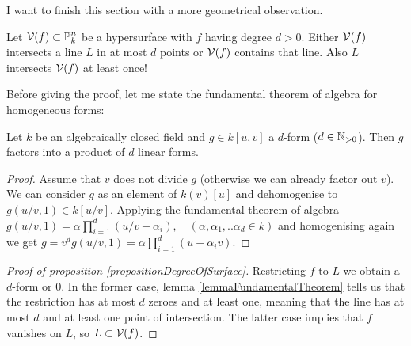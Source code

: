 I want to finish this section with a more geometrical observation.
\begin{proposition} \label{propositionDegreeOfSurface}
Let $\operatorname{\mathcal V}(f) \subset \operatorname{\mathbb P}^n_k$ be a hypersurface with $f$ having degree $d> 0$.
Either $\operatorname{\mathcal V}(f)$ intersects a line $L$ in at most $d$ points or $\operatorname{\mathcal V}(f)$ contains that line.
Also $L$ intersects $\operatorname{\mathcal V}(f)$ at least once!
\end{proposition}

Before giving the proof, let me state the fundamental theorem of algebra for homogeneous forms:

\begin{lemma} \label{lemmaFundamentalTheorem}
Let $k$ be an algebraically closed field and $g \in k[u,v]$ a $d$-form ($d \in \operatorname{\mathbb N_{>0}}$).
Then $g$ factors into a product of $d$ linear forms.
\end{lemma}
\begin{proof}
Assume that $v$ does not divide $g$ (otherwise we can already factor out $v$).
We can consider $g$ as an element of $k(v)[u]$ and dehomogenise to $g(u/v,1) \in k[u/v]$.
Applying the fundamental theorem of algebra $g(u/v,1) = \alpha\prod_{i=1}^d(u/v - \alpha_i), \quad (\alpha,\alpha_1,..\alpha_d \in k)$ and homogenising again we get
$g = v^d g(u/v,1) = \alpha\prod_{i=1}^d(u - \alpha_iv)$.
\end{proof}

\begin{proof}[Proof of proposition \ref{propositionDegreeOfSurface}]
Restricting $f$ to $L$ we obtain a $d$-form or 0.
In the former case, lemma \ref{lemmaFundamentalTheorem} tells us that the restriction has at most $d$ zeroes and at least one, meaning that the line has at most $d$ and at least one point of intersection.
The latter case implies that $f$ vanishes on $L$, so $L \subset \operatorname{\mathcal V}(f)$.
\end{proof}
